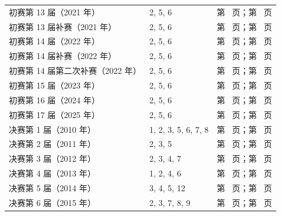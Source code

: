 \documentclass[UTF8,12pt,a4paper,fontset=fandol]{ctexart}
\begin{document}
\begin{longtable}{p{}p{}p{}}
初赛第 13 届（2021 年） & 2, 5, 6 & 第~\pageref{ex:ch07-13th-A:2} 页；第~\pageref{ans:ch07-13th-A:2} 页\\

初赛第 13 届补赛（2021 年） & 2, 5, 6 & 第~\pageref{ex:ch08-13th-A-makeup:2} 页；第~\pageref{ans:ch08-13th-A-makeup:2} 页\\

初赛第 14 届（2022 年） & 2, 5, 6 & 第~\pageref{ex:ch04-14th-A:2} 页；第~\pageref{ans:ch04-14th-A:2} 页\\

初赛第 14 届补赛（2022 年） & 2, 5, 6 & 第~\pageref{ex:ch05-14th-A-makeup:2} 页；第~\pageref{ans:ch05-14th-A-makeup:2} 页\\

初赛第 14 届第二次补赛（2022 年） & 2, 5, 6 & 第~\pageref{ex:ch06-14th-A-makeup2:2} 页；第~\pageref{ans:ch06-14th-A-makeup2:2} 页\\

初赛第 15 届（2023 年） & 2, 5, 6 & 第~\pageref{ex:ch03-15th-A:2} 页；第~\pageref{ans:ch03-15th-A:2} 页\\

初赛第 16 届（2024 年） & 2, 5, 6 & 第~\pageref{ex:ch02-16th-A:2} 页；第~\pageref{ans:ch02-16th-A:2} 页\\

初赛第 17 届（2025 年） & 2, 5, 6 & 第~\pageref{ex:ch01-17th-A:2} 页；第~\pageref{ans:ch01-17th-A:2} 页\\

决赛第 1 届（2010 年） & 1, 2, 3, 5, 6, 7, 8 & 第~\pageref{ex:fin01-all:1} 页；第~\pageref{ans:fin01-all:1} 页\\

决赛第 2 届（2011 年） & 2, 3, 5 & 第~\pageref{ex:fin02-all:2} 页；第~\pageref{ans:fin02-all:2} 页\\

决赛第 3 届（2012 年） & 2, 3, 4, 7 & 第~\pageref{ex:fin03-all:2} 页；第~\pageref{ans:fin03-all:2} 页\\

决赛第 4 届（2013 年） & 1, 2, 4, 6 & 第~\pageref{ex:fin04-all:1} 页；第~\pageref{ans:fin04-all:1} 页\\

决赛第 5 届（2014 年） & 3, 4, 5, 12 & 第~\pageref{ex:fin05-hi:3} 页；第~\pageref{ans:fin05-hi:3} 页\\

决赛第 6 届（2015 年） & 2, 3, 7, 8, 9 & 第~\pageref{ex:fin06-lo:2} 页；第~\pageref{ans:fin06-lo:2} 页\\


\end{longtable}
\end{document}
